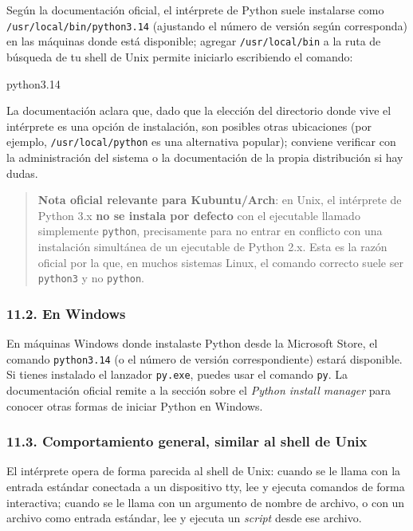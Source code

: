 \documentclass[
  doc,
  floatsintext,
  longtable,
  a4paper,
  nolmodern,
  notxfonts,
  notimes,
  12pt,
  colorlinks=true,linkcolor=blue,citecolor=blue,urlcolor=blue]{apa7}
\newenvironment{Shaded}{\begin{snugshade}}{\end{snugshade}}
\newcommand{\ExtensionTok}[1]{\textcolor[rgb]{0.00,0.23,0.31}{#1}}
\begin{document}
Según la documentación oficial, el intérprete de Python suele instalarse
como \texttt{/usr/local/bin/python3.14} (ajustando el número de versión
según corresponda) en las máquinas donde está disponible; agregar
\texttt{/usr/local/bin} a la ruta de búsqueda de tu shell de Unix
permite iniciarlo escribiendo el comando:

\begin{Shaded}
\begin{Highlighting}[]
\ExtensionTok{python3.14}
\end{Highlighting}
\end{Shaded}

La documentación aclara que, dado que la elección del directorio donde
vive el intérprete es una opción de instalación, son posibles otras
ubicaciones (por ejemplo, \texttt{/usr/local/python} es una alternativa
popular); conviene verificar con la administración del sistema o la
documentación de la propia distribución si hay dudas.

\begin{quote}
\textbf{Nota oficial relevante para Kubuntu/Arch}: en Unix, el
intérprete de Python 3.x \textbf{no se instala por defecto} con el
ejecutable llamado simplemente \texttt{python}, precisamente para no
entrar en conflicto con una instalación simultánea de un ejecutable de
Python 2.x. Esta es la razón oficial por la que, en muchos sistemas
Linux, el comando correcto suele ser \texttt{python3} y no
\texttt{python}.
\end{quote}

\subsubsection{11.2. En Windows}\label{en-windows}

En máquinas Windows donde instalaste Python desde la Microsoft Store, el
comando \texttt{python3.14} (o el número de versión correspondiente)
estará disponible. Si tienes instalado el lanzador \texttt{py.exe},
puedes usar el comando \texttt{py}. La documentación oficial remite a la
sección sobre el \emph{Python install manager} para conocer otras formas
de iniciar Python en Windows.

\subsubsection{11.3. Comportamiento general, similar al shell de
Unix}\label{comportamiento-general-similar-al-shell-de-unix}

El intérprete opera de forma parecida al shell de Unix: cuando se le
llama con la entrada estándar conectada a un dispositivo tty, lee y
ejecuta comandos de forma interactiva; cuando se le llama con un
argumento de nombre de archivo, o con un archivo como entrada estándar,
lee y ejecuta un \emph{script} desde ese archivo.
\end{document}
